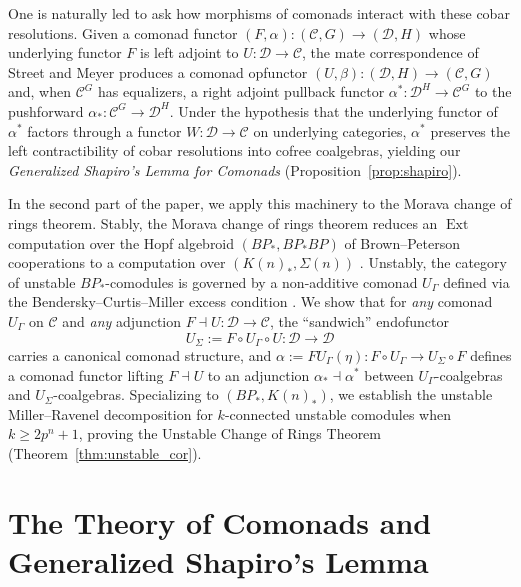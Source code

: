 \documentclass[11pt,reqno]{amsart}
\theoremstyle{plain}
\theoremstyle{definition}
\newcommand{\Ext}{\operatorname{Ext}}
\begin{document}
One is naturally led to ask how morphisms of comonads interact with these cobar resolutions. Given a comonad functor $(F,\alpha): (\mathcal{C},G) \to (\mathcal{D},H)$ whose underlying functor $F$ is left adjoint to $U: \mathcal{D} \to \mathcal{C}$, the mate correspondence of Street \cite{street} and Meyer \cite{meyer} produces a comonad opfunctor $(U,\beta): (\mathcal{D},H) \to (\mathcal{C},G)$ and, when $\mathcal{C}^G$ has equalizers, a right adjoint pullback functor $\alpha^* : \mathcal{D}^H \to \mathcal{C}^G$ to the pushforward $\alpha_* : \mathcal{C}^G \to \mathcal{D}^H$. Under the hypothesis that the underlying functor of $\alpha^*$ factors through a functor $W: \mathcal{D} \to \mathcal{C}$ on underlying categories, $\alpha^*$ preserves the left contractibility of cobar resolutions into cofree coalgebras, yielding our \emph{Generalized Shapiro's Lemma for Comonads} (Proposition~\ref{prop:shapiro}).

In the second part of the paper, we apply this machinery to the Morava change of rings theorem. Stably, the Morava change of rings theorem reduces an $\Ext$ computation over the Hopf algebroid $(BP_*, BP_*BP)$ of Brown--Peterson cooperations to a computation over $(K(n)_*, \Sigma(n))$ \cite{mr}. Unstably, the category of unstable $BP_*$-comodules is governed by a non-additive comonad $U_{\Gamma}$ defined via the Bendersky--Curtis--Miller excess condition \cite{bcm,bendersky1}. We show that for \emph{any} comonad $U_{\Gamma}$ on $\mathcal{C}$ and \emph{any} adjunction $F \dashv U : \mathcal{D} \to \mathcal{C}$, the ``sandwich'' endofunctor
\[
  U_{\Sigma} := F \circ U_{\Gamma} \circ U : \mathcal{D} \to \mathcal{D}
\]
carries a canonical comonad structure, and $\alpha := F U_{\Gamma}(\eta) : F \circ U_{\Gamma} \to U_{\Sigma} \circ F$ defines a comonad functor lifting $F \dashv U$ to an adjunction $\alpha_* \dashv \alpha^*$ between $U_{\Gamma}$-coalgebras and $U_{\Sigma}$-coalgebras. Specializing to $(BP_*, K(n)_*)$, we establish the unstable Miller--Ravenel decomposition for $k$-connected unstable comodules when $k \ge 2p^n + 1$, proving the Unstable Change of Rings Theorem (Theorem~\ref{thm:unstable_cor}).

\section{The Theory of Comonads and Generalized Shapiro's Lemma}
\end{document}
